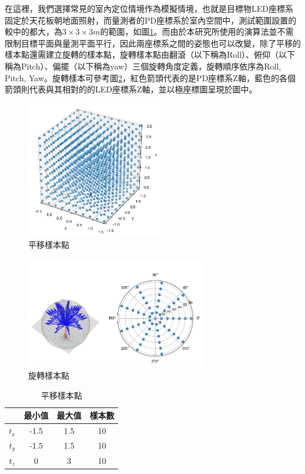 在這裡，我們選擇常見的室內定位情境作為模擬情境，也就是目標物LED座標系固定於天花板朝地面照射，而量測者的PD座標系於室內空間中，測試範圍設置的較\cite{case:cart3d}\cite{case:3d_layers}中的都大，為$3 \times 3 \times 3 m$的範圍，如圖\ref{pic:translate_sample}。而由於本研究所使用的演算法並不需限制目標平面與量測平面平行，因此兩座標系之間的姿態也可以改變，除了平移的樣本點還需建立旋轉的樣本點，旋轉樣本點由翻滾（以下稱為Roll）、俯仰（以下稱為Pitch）、偏擺（以下稱為yaw）三個旋轉角度定義，旋轉順序依序為Roll, Pitch, Yaw。旋轉樣本可參考圖\ref{pic:rotate_sample}，紅色箭頭代表的是PD座標系Z軸，藍色的各個箭頭則代表與其相對的的LED座標系Z軸，並以極座標圖呈現於圖中。

\begin{figure}[ht]
    \centering
    \includegraphics[width=6cm]{ch4pic/translate_sample.png}
    \caption{平移樣本點}
    \label{pic:translate_sample}
\end{figure}

\begin{figure}[ht]
    \centering
    \includegraphics[width=8cm]{ch4pic/rotate_sample.png}
    \caption{旋轉樣本點}
    \label{pic:rotate_sample}
\end{figure}

\begin{table}[h!]
    \begin{center}
      \caption{平移樣本點}
      \label{tab:translate}
      \begin{tabular}{c|c|c|c} %
         & \textbf{最小值} & \textbf{最大值}&\textbf{樣本數}\\
        \hline
        $t_x$ & -1.5 & 1.5&10\\
        $t_y$ & -1.5 & 1.5&10\\
        $t_z$ & 0 & 3 &10\\
      \end{tabular}
    \end{center}
  \end{table}

